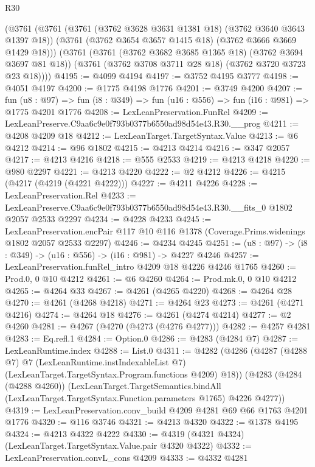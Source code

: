 \begin{lexlean}{R30}
\begin{coremodule}
    (@3761
      (@3761
        (@3761 (@3762 @3628 @3631 @1381 @18) (@3762 @3640 @3643 @1397 @18))
        (@3761 (@3762 @3654 @3657 @1415 @18) (@3762 @3666 @3669 @1429 @18)))
      (@3761
        (@3761 (@3762 @3682 @3685 @1365 @18) (@3762 @3694 @3697 @81 @18))
        (@3761 (@3762 @3708 @3711 @28 @18) (@3762 @3720 @3723 @23 @18))))
@4195 := @4099 @4194
@4197 := @3752 @4195 @3777
@4198 := @4051 @4197
@4200 := @1775 @4198 @1776
@4201 := @3749 @4200
@4207 := fun (u8 : @97) =>
  fun (i8 : @349) => fun (u16 : @556) => fun (i16 : @981) => @1775 @4201 @1776
@4208 := LexLeanPreservation.FunRel
@4209 := LexLeanPreserve.C9aa6c9e0f793b0377b6550ad98d54e43.R30.__prog
@4211 := @4208 @4209 @18
@4212 := LexLeanTarget.TargetSyntax.Value
@4213 := @6 @4212
@4214 := @96 @1802
@4215 := @4213 @4214
@4216 := @347 @2057
@4217 := @4213 @4216
@4218 := @555 @2533
@4219 := @4213 @4218
@4220 := @980 @2297
@4221 := @4213 @4220
@4222 := @2 @4212
@4226 := @4215 (@4217 (@4219 (@4221 @4222)))
@4227 := @4211 @4226
@4228 := LexLeanPreservation.Rel
@4233 := LexLeanPreserve.C9aa6c9e0f793b0377b6550ad98d54e43.R30.__fits_0 @1802 @2057 @2533 @2297
@4234 := @4228 @4233
@4245 := LexLeanPreservation.encPair
    @117
    @10
    @116
    @1378
    (Coverage.Prims.widenings @1802 @2057 @2533 @2297)
@4246 := @4234 @4245
@4251 := (u8 : @97) -> (i8 : @349) -> (u16 : @556) -> (i16 : @981) -> @4227 @4246
@4257 := LexLeanPreservation.funRel_intro @4209 @18 @4226 @4246 @1765
@4260 := Prod.{0, 0} @10 @4212
@4261 := @6 @4260
@4264 := Prod.mk.{0, 0} @10 @4212
@4265 := @4264 @33
@4267 := @4261 (@4265 @4220)
@4268 := @4264 @28
@4270 := @4261 (@4268 @4218)
@4271 := @4264 @23
@4273 := @4261 (@4271 @4216)
@4274 := @4264 @18
@4276 := @4261 (@4274 @4214)
@4277 := @2 @4260
@4281 := @4267 (@4270 (@4273 (@4276 @4277)))
@4282 := @4257 @4281
@4283 := Eq.refl.{1}
@4284 := Option.{0}
@4286 := @4283 (@4284 @7)
@4287 := LexLeanRuntime.index
@4288 := List.{0}
@4311 := @4282
    (@4286
      (@4287
        (@4288 @7)
        @7
        (LexLeanRuntime.instIndexableList @7)
        (LexLeanTarget.TargetSyntax.Program.functions @4209)
        @18))
    (@4283
      (@4284 (@4288 @4260))
      (LexLeanTarget.TargetSemantics.bindAll
        (LexLeanTarget.TargetSyntax.Function.parameters @1765)
        @4226
        @4277))
@4319 := LexLeanPreservation.conv_build @4209 @4281 @69 @66 @1763 @4201 @1776
@4320 := @116 @3746
@4321 := @4213 @4320
@4322 := @1378 @4195
@4324 := @4213 @4322 @4222
@4330 := @4319 (@4321 @4324) (LexLeanTarget.TargetSyntax.Value.pair @4320 @4322)
@4332 := LexLeanPreservation.convL_cons @4209
@4333 := @4332 @4281

\end{coremodule}
\end{lexlean}
